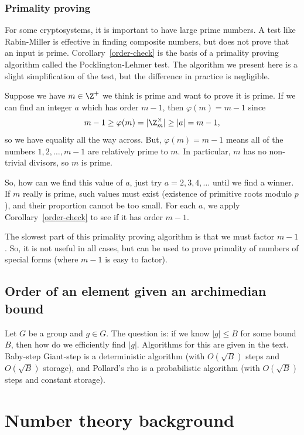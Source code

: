 \documentclass[12pt]{amsart}
\theoremstyle{plain}
\theoremstyle{definition}
\theoremstyle{remark}
\begin{document}
\subsubsection{Primality proving}
For some cryptosystems, it is important to have large prime numbers.
A test like Rabin-Miller is effective in finding composite numbers,
but does not prove that an input is prime.
Corollary~\ref{order-check} is the basis of a primality proving
algorithm called the Pocklington-Lehmer test.  The algorithm we
present here is a slight simplification of the test, but the
difference in practice is negligible.

Suppose we have $m\in\Z^+$ we think is prime and want to prove it is
prime.  If we can find an integer $a$ which has order $m-1$, then
$\varphi(m)=m-1$ since
\[ m-1 \geq \varphi(m)=|\Z_m^\times|\geq |a| = m-1,\]
so we have equality all the way across.  But, $\varphi(m)=m-1$ means
all of the numbers $1,2,\ldots, m-1$ are relatively prime to $m$.  In
particular, $m$ has no non-trivial divisors, so $m$ is prime.

So, how can we find this value of $a$, just try $a=2, 3, 4, \ldots$
until we find a winner.  If $m$ really is prime, such values must
exist (existence of primitive roots modulo $p$), and their proportion
cannot be too small.  For each $a$, we apply
Corollary~\ref{order-check} to see if it has order $m-1$.

The slowest part of this primality proving algorithm is that we must
factor $m-1$.  So, it is not useful in all cases, but can be used to
prove primality of numbers of special forms (where $m-1$ is easy to
factor).


\subsection{Order of an element given an archimedian bound}

Let $G$ be a group and $g\in G$.  The question is: if we know
$|g|\leq B$ for some bound $B$, then how do we efficiently find
$|g|$. Algorithms for this are given in the text.  Baby-step
Giant-step is a deterministic algorithm (with $O(\sqrt{B})$ steps and
$O(\sqrt{B})$ storage), and Pollard's rho is a probabilistic algorithm
(with $O(\sqrt{B})$ steps and constant storage).

\section{Number theory background}
\end{document}
